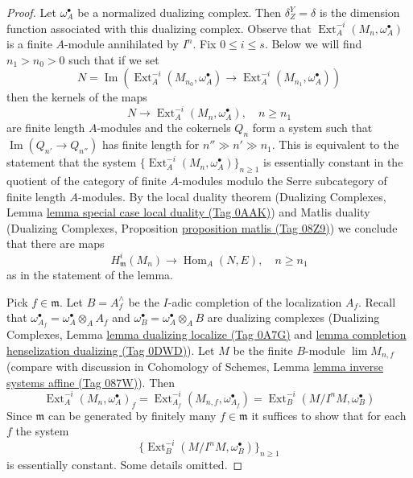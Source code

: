 \documentclass{amsart}
\theoremstyle{plain}
\theoremstyle{definition}
\theoremstyle{remark}
\numberwithin{equation}{subsection}
\def\lim{\mathop{\mathrm{lim}}\nolimits}
\def\Hom{\mathop{\mathrm{Hom}}\nolimits}
\def\Ext{\mathop{\mathrm{Ext}}\nolimits}
\def\Im{\mathop{\mathrm{Im}}}
\begin{document}
\begin{proof}
Let $\omega_A^\bullet$ be a normalized dualizing complex. Then
$\delta^Y_Z = \delta$ is the dimension function associated with
this dualizing complex.
Observe that $\Ext^{-i}_A(M_n, \omega_A^\bullet)$ is a finite $A$-module
annihilated by $I^n$. Fix $0 \leq i \leq s$.
Below we will find $n_1 > n_0 > 0$ such that if we set
$$
N = \Im(\Ext^{-i}_A(M_{n_0}, \omega_A^\bullet) \to
\Ext^{-i}_A(M_{n_1}, \omega_A^\bullet))
$$
then the kernels of the maps
$$
N \to \Ext^{-i}_A(M_n, \omega_A^\bullet),\quad n \geq n_1
$$
are finite length $A$-modules and the cokernels $Q_n$ form a
system such that $\Im(Q_{n'} \to Q_{n''})$ has finite length
for $n'' \gg n' \gg n_1$. This is equivalent to the statement that
the system $\{\Ext^{-i}_A(M_n, \omega_A^\bullet)\}_{n \geq 1}$
is essentially constant in the quotient of the category of finite
$A$-modules modulo the Serre subcategory of finite length $A$-modules.
By the local duality theorem
(Dualizing Complexes, Lemma \href{https://stacks.math.columbia.edu/tag/0AAK}{lemma special case local duality (Tag 0AAK)})
and Matlis duality
(Dualizing Complexes, Proposition \href{https://stacks.math.columbia.edu/tag/08Z9}{proposition matlis (Tag 08Z9)})
we conclude that there are maps
$$
H^i_\mathfrak m(M_n) \to \Hom_A(N, E),\quad n \geq n_1
$$
as in the statement of the lemma.

\medskip\noindent
Pick $f \in \mathfrak m$. Let $B = A_f^\wedge$ be the $I$-adic completion
of the localization $A_f$. Recall that
$\omega_{A_f}^\bullet = \omega_A^\bullet \otimes_A A_f$
and $\omega_B^\bullet = \omega_A^\bullet \otimes_A B$ are dualizing
complexes (Dualizing Complexes, Lemma \href{https://stacks.math.columbia.edu/tag/0A7G}{lemma dualizing localize (Tag 0A7G)}
and \href{https://stacks.math.columbia.edu/tag/0DWD}{lemma completion henselization dualizing (Tag 0DWD)}).
Let $M$ be the finite $B$-module $\lim M_{n, f}$ (compare with
discussion in Cohomology of Schemes, Lemma
\href{https://stacks.math.columbia.edu/tag/087W}{lemma inverse systems affine (Tag 087W)}). Then
$$
\Ext^{-i}_A(M_n, \omega_A^\bullet)_f =
\Ext^{-i}_{A_f}(M_{n, f}, \omega_{A_f}^\bullet) =
\Ext^{-i}_B(M/I^n M, \omega_B^\bullet)
$$
Since $\mathfrak m$ can be generated by finitely many $f \in \mathfrak m$
it suffices to show that for each $f$ the system
$$
\{\Ext^{-i}_B(M/I^n M, \omega_B^\bullet)\}_{n \geq 1}
$$
is essentially constant. Some details omitted.


\end{proof}
\end{document}
